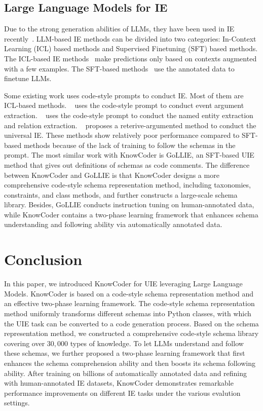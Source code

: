 \subsection{Large Language Models for IE}
Due to the strong generation abilities of LLMs, they have been used in
IE recently~\cite{xu2023large}. LLM-based IE methods can be divided into
two categories: In-Context Learning (ICL) based methods and Supervised Finetuning (SFT) based methods. The
ICL-based IE methods~\cite{codeie, guo2023retrieval, ashok2023promptner,
wang2023gpt} make predictions only based on contexts augmented with a few
examples. The SFT-based methods~\cite{wangdeepstruct, gui2023instructie,
wang2023instructuie, zhou2023universalner, xu2023large, sainz2023gollie} use the
annotated data to finetune LLMs.

Some existing work uses code-style prompts to conduct IE. Most of them are
ICL-based methods. ~\citet{wang2022code4struct} uses the code-style prompt to
conduct event argument extraction. ~\citet{codeie} uses the code-style prompt to
conduct the named entity extraction and relation extraction.
~\cite{guo2023retrieval} proposes a reterive-argumented method to conduct the
universal IE. These methods show relatively poor performance compared to
SFT-based methods because of the lack of training to follow the schemas in the
prompt. The most similar work with KnowCoder is GoLLIE, an SFT-based UIE method
that gives out definitions of schemas as code comments. The difference between
KnowCoder and GoLLIE is that KnowCoder designs a more comprehensive code-style
schema representation method, including taxonomies, constraints, and class
methods, and further constructs a large-scale schema library. Besides, GoLLIE
conducts instruction tuning on human-annotated data, while KnowCoder contains a
two-phase learning framework that enhances schema understanding and following
ability via automatically annotated data. 

\section*{Conclusion}

  In this paper, we introduced KnowCoder for UIE leveraging Large Language
  Models. KnowCoder is based on a code-style schema representation method and
  an effective two-phase learning framework. The code-style schema representation
  method uniformly transforms different schemas into Python classes, with which
  the UIE task can be converted to a code generation process. Based on the schema representation
  method, we constructed a comprehensive code-style schema library covering over $30,000$
  types of knowledge. To let LLMs understand and follow these schemas, we
  further proposed a two-phase learning framework that first enhances the
  schema comprehension ability and then boosts its schema following ability. After training on billions of automatically annotated data and refining with human-annotated IE datasets, KnowCoder demonstrates remarkable performance improvements on different IE tasks under the various evalution settings.

